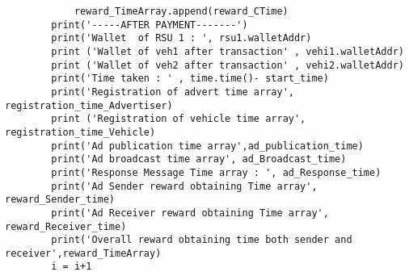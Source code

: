 \begin{linenumbers}
\begin{lstlisting}
            reward_TimeArray.append(reward_CTime)
        print('-----AFTER PAYMENT-------')
        print('Wallet  of RSU 1 : ', rsu1.walletAddr)
        print ('Wallet of veh1 after transaction' , vehi1.walletAddr)
        print ('Wallet of veh2 after transaction' , vehi2.walletAddr)
        print('Time taken : ' , time.time()- start_time)
        print('Registration of advert time array', registration_time_Advertiser)
        print ('Registration of vehicle time array', registration_time_Vehicle)
        print('Ad publication time array',ad_publication_time)
        print('Ad broadcast time array', ad_Broadcast_time)
        print('Response Message Time array : ', ad_Response_time)
        print('Ad Sender reward obtaining Time array', reward_Sender_time)
        print('Ad Receiver reward obtaining Time array', reward_Receiver_time)
        print('Overall reward obtaining time both sender and receiver',reward_TimeArray)
        i = i+1


\end{lstlisting}
\end{linenumbers} 

